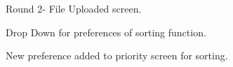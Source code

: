 \documentclass{report}
\begin{document}
\begin{figure}
\caption{Round 2- File Uploaded screen.}
\end{figure}

\begin{figure}
\caption{Drop Down for preferences of sorting function.}
\end{figure}

\begin{figure}
\caption{New preference added to priority screen for sorting.}
\end{figure}
\end{document}
